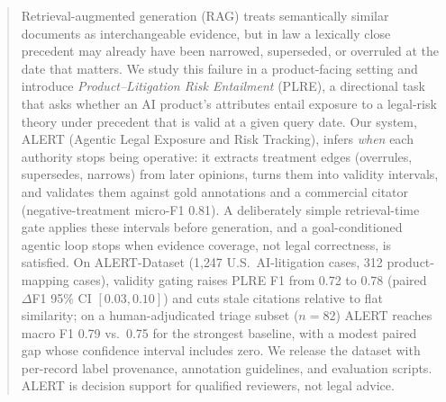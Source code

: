 \begin{abstract}
Retrieval-augmented generation (RAG) treats semantically similar documents as interchangeable evidence, but in law a lexically close precedent may already have been narrowed, superseded, or overruled at the date that matters. We study this failure in a product-facing setting and introduce \emph{Product--Litigation Risk Entailment} (PLRE), a directional task that asks whether an AI product's attributes entail exposure to a legal-risk theory under precedent that is valid at a given query date. Our system, ALERT (Agentic Legal Exposure and Risk Tracking), infers \emph{when} each authority stops being operative: it extracts treatment edges (overrules, supersedes, narrows) from later opinions, turns them into validity intervals, and validates them against gold annotations and a commercial citator (negative-treatment micro-F1 0.81). A deliberately simple retrieval-time gate applies these intervals before generation, and a goal-conditioned agentic loop stops when evidence coverage, not legal correctness, is satisfied. On ALERT-Dataset (1{,}247 U.S.\ AI-litigation cases, 312 product-mapping cases), validity gating raises PLRE F1 from 0.72 to 0.78 (paired $\Delta$F1 95\% CI $[0.03,0.10]$) and cuts stale citations relative to flat similarity; on a human-adjudicated triage subset ($n{=}82$) ALERT reaches macro F1 0.79 vs.\ 0.75 for the strongest baseline, with a modest paired gap whose confidence interval includes zero. We release the dataset with per-record label provenance, annotation guidelines, and evaluation scripts. ALERT is decision support for qualified reviewers, not legal advice.
\end{abstract}
